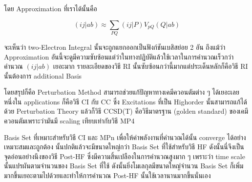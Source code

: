 โดย Approximation ที่เราได้นั้นคือ

\begin{equation}
    (ij|ab) \approx \sum_{PQ} (ij|P) V_{pQ} (Q|ab)
\end{equation}

จะเห็นว่า two-Electron Integral นั้นจะถูกแยกออกเป็นฟังก์ชันเบสิสย่อย 2 อัน ถึงแม้ว่า Approximation
อันนี้จะดูมีความซับซ้อนแต่ว่าในทางปฏิบัติแล้วใช้เวลาในการคำนวณเร็วกว่าคำนวณ $(ij|ab)$ เยอะมาก
รายละเอียดของวิธี RI นั้นซับซ้อนกว่านี้มากแต่ประเด็นหลักก็คือวิธี RI นั้นต้องการ additional Basis

โดยสรุปก็คือ Perturbation Method สามารถช่วยแก้ปัญหาทางเคมีควอนตัมต่าง ๆ ได้เยอะเลย หนึ่งใน applications
ก็คือวิธี CI กับ CC ซึ่ง Excitations ที่เป็น Highorder นั้นสามารถแก้ได้ด้วย Perturbation Theory
แล้วก็วิธี CCSD(T) คือวิธีมาตรฐาน (golden standard) ของเคมีควอนตัมเพราะว่ามันมี scaling เทียบเท่ากับวิธี MP4

Basis Set ที่เหมาะสำหรับวิธี CI และ MPn เพื่อให้ค่าพลังงานที่คำนวณได้นั้น converge ได้อย่างเหมาะสมและถูกต้อง%
นั้นปกติแล้วจะมีขนาดใหญ่กว่า Basis Set ที่ใช้สำหรับวิธี HF ดังนั้นนี่จึงเป็นจุดอ่อนอย่างนึงของวิธี Post-HF
ซึ่งมีความสิ้นเปลืองในการคำนวณสูงมาก ๆ เพราะว่า time scale นั้นแปรผันตามจำนวนของ Basis Set ที่ใช้
ดังนั้นยิ่งโมเลกุลมีขนาดใหญ่จำนวน Basis Set ก็เพิ่มมากขึ้นเยอะตามไปด้วยและทำให้การคำนวณ Post-HF
นั้นใช้เวลานานมากขึ้นนั่นเอง

